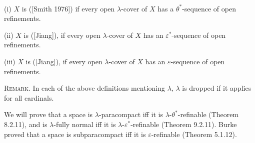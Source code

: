 \documentclass[prelim.tex]{subfiles}
\begin{document}
{ \label{def:1.1.9}
\textup{(i)} $X$ is  
  	\textup{([Smith 1976]\textsuperscript{\cite{Smith1976}})} if every open $\lambda$-cover of 
  	$X$ has a  $\theta^*$-sequence of open refinements.
  	
\textup{(ii)}  $X$ is 
	\textup{([Jiang])}, if every open $\lambda$-cover of 
	$X$ has an  $\varepsilon^*$-sequence of open refinements.
 
\textup{(iii)}  $X$ is 
 \textup{([Jiang])},
	if every open $\lambda$-cover of 
	$X$ has an  $\varepsilon$-sequence of open refinements.
} %

\vspace{8pt}
\textsc{Remark.} In each of the above definitions mentioning $\lambda$, 
$\lambda$ is dropped if it applies for all 
cardinals.

We will prove that a space is $\lambda$-paracompact iff it is
$\lambda$-$\theta^*$-refinable 
(Theorem 8.2.11), %
and is $\lambda$-fully normal iff it is $\lambda$-$\varepsilon^*$-refinable 
(Theorem 9.2.11). %
Burke proved that a space is subparacompact iff it is 
$\varepsilon$-refinable 
(Theorem 5.1.12). %
\end{document}
